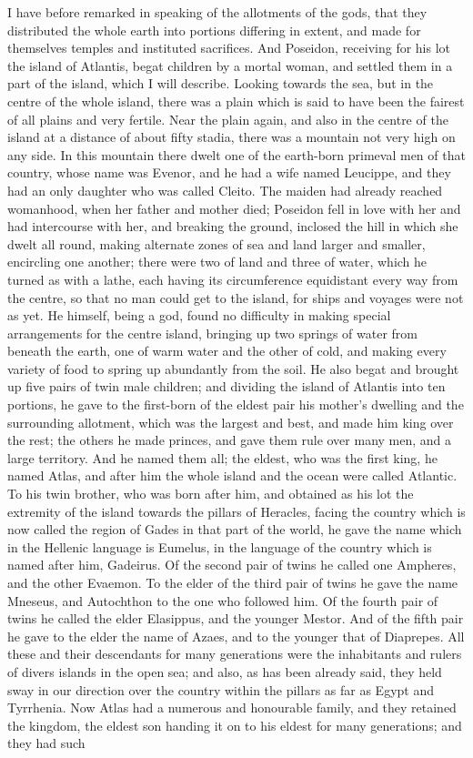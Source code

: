 \documentclass[11pt,letter]{article}
\begin{document}
\par  I have before remarked in speaking of the allotments of the gods, that they distributed the whole earth into portions differing in extent, and made for themselves temples and instituted sacrifices. And Poseidon, receiving for his lot the island of Atlantis, begat children by a mortal woman, and settled them in a part of the island, which I will describe. Looking towards the sea, but in the centre of the whole island, there was a plain which is said to have been the fairest of all plains and very fertile. Near the plain again, and also in the centre of the island at a distance of about fifty stadia, there was a mountain not very high on any side. In this mountain there dwelt one of the earth-born primeval men of that country, whose name was Evenor, and he had a wife named Leucippe, and they had an only daughter who was called Cleito. The maiden had already reached womanhood, when her father and mother died; Poseidon fell in love with her and had intercourse with her, and breaking the ground, inclosed the hill in which she dwelt all round, making alternate zones of sea and land larger and smaller, encircling one another; there were two of land and three of water, which he turned as with a lathe, each having its circumference equidistant every way from the centre, so that no man could get to the island, for ships and voyages were not as yet. He himself, being a god, found no difficulty in making special arrangements for the centre island, bringing up two springs of water from beneath the earth, one of warm water and the other of cold, and making every variety of food to spring up abundantly from the soil. He also begat and brought up five pairs of twin male children; and dividing the island of Atlantis into ten portions, he gave to the first-born of the eldest pair his mother's dwelling and the surrounding allotment, which was the largest and best, and made him king over the rest; the others he made princes, and gave them rule over many men, and a large territory. And he named them all; the eldest, who was the first king, he named Atlas, and after him the whole island and the ocean were called Atlantic. To his twin brother, who was born after him, and obtained as his lot the extremity of the island towards the pillars of Heracles, facing the country which is now called the region of Gades in that part of the world, he gave the name which in the Hellenic language is Eumelus, in the language of the country which is named after him, Gadeirus. Of the second pair of twins he called one Ampheres, and the other Evaemon. To the elder of the third pair of twins he gave the name Mneseus, and Autochthon to the one who followed him. Of the fourth pair of twins he called the elder Elasippus, and the younger Mestor. And of the fifth pair he gave to the elder the name of Azaes, and to the younger that of Diaprepes. All these and their descendants for many generations were the inhabitants and rulers of divers islands in the open sea; and also, as has been already said, they held sway in our direction over the country within the pillars as far as Egypt and Tyrrhenia. Now Atlas had a numerous and honourable family, and they retained the kingdom, the eldest son handing it on to his eldest for many generations; and they had such 
\end{document}
